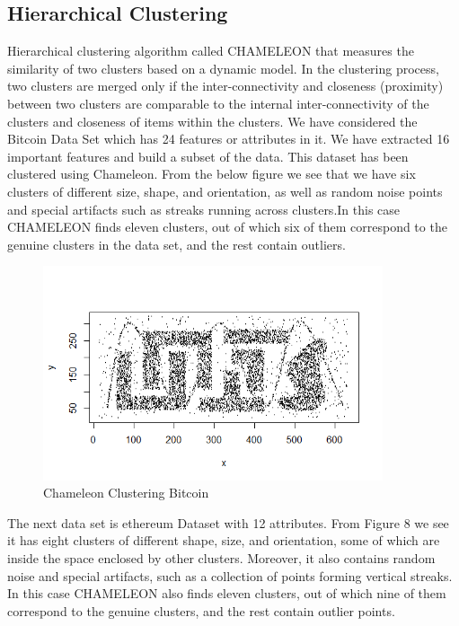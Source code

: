 \documentclass{article}
\begin{document}
\subsection{Hierarchical Clustering}
Hierarchical clustering algorithm called CHAMELEON that measures the similarity of two clusters based on a dynamic model. In the clustering process, two clusters are merged only if the inter-connectivity and closeness (proximity) between two clusters are comparable to the internal inter-connectivity of the clusters and closeness of items within the clusters. We have considered the Bitcoin Data Set which has 24 features or attributes in it. We have extracted 16 important features and build a subset of the data. This dataset has been clustered using Chameleon. From the below figure we see that we have six clusters of different size, shape, and orientation, as well as random noise points and special artifacts such as streaks running across clusters.In this case CHAMELEON finds eleven clusters, out of which six of them correspond to the genuine clusters in the data set, and the rest contain outliers.\newline

\begin{figure}[h]
    \centering
    \includegraphics[width=10cm]{chameleonBitcoinFig1.png}
    \caption{Chameleon Clustering Bitcoin}
    \label{fig:my_label}
\end{figure}

The next data set is ethereum Dataset with 12 attributes. From Figure 8 we see it has eight clusters of different shape, size, and orientation, some of which are inside the space enclosed by other clusters. Moreover, it also contains random noise and special artifacts, such as a collection of points forming vertical streaks. In this case CHAMELEON also finds eleven clusters, out of which nine of them correspond to the genuine clusters, and the rest contain outlier points.
\end{document}
